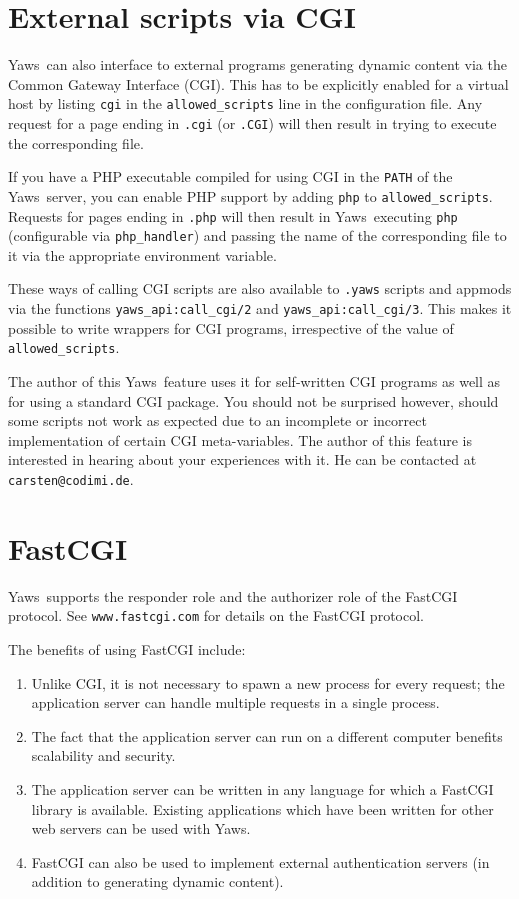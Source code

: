 \documentclass[11pt,oneside,english]{book}
\newcommand{\Yaws}            %
        {{\sc Yaws}}
\begin{document}
\chapter{External scripts via CGI}

\Yaws\  can also interface to external programs generating dynamic
content via the Common Gateway Interface (CGI).  This has to be
explicitly enabled for a virtual host by listing \verb+cgi+ in the
\verb+allowed_scripts+ line in the configuration file.  Any request
for a page ending in \verb+.cgi+ (or \verb+.CGI+) will then result in
trying to execute the corresponding file.

If you have a PHP executable compiled for using CGI in the \verb+PATH+
of the \Yaws\  server, you can enable PHP support by adding \verb+php+ to
\verb+allowed_scripts+.  Requests for pages ending in \verb+.php+ will
then result in \Yaws\  executing \verb+php+ (configurable via
\verb+php_handler+) and passing the name of the corresponding file to
it via the appropriate environment variable.

These ways of calling CGI scripts are also available to \verb+.yaws+
scripts and appmods via the functions \verb+yaws_api:call_cgi/2+ and
\verb+yaws_api:call_cgi/3+.  This makes it possible to write wrappers
for CGI programs, irrespective of the value of \verb+allowed_scripts+.

The author of this \Yaws\  feature uses it for self-written CGI programs
as well as for using a standard CGI package.  You should not be
surprised however, should some scripts not work as expected due to an
incomplete or incorrect implementation of certain CGI meta-variables.
The author of this feature is interested in hearing about your
experiences with it.  He can be contacted at \verb+carsten@codimi.de+.

\chapter{FastCGI}

\Yaws\  supports the responder role and the authorizer role of the
FastCGI protocol. See \verb+www.fastcgi.com+ for details on the
FastCGI protocol.

The benefits of using FastCGI include:
\begin{enumerate}
\item Unlike CGI, it is not necessary to spawn a new process for
every request; the application server can handle multiple requests
in a single process.
\item The fact that the application server can run on a different
computer benefits scalability and security.
\item The application server can be written in any language for
which a FastCGI library is available. Existing applications
which have been written for other web servers can be used with
\Yaws{}.
\item FastCGI can also be used to implement external authentication
servers (in addition to generating dynamic content).
\end{enumerate}
\end{document}
